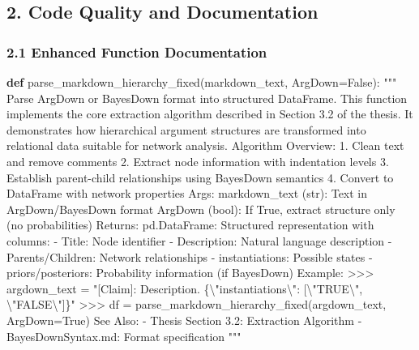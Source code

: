 \documentclass[
  11pt,
  letterpaper,
]{book}
\newenvironment{Shaded}{\begin{snugshade}}{\end{snugshade}}
\newcommand{\CharTok}[1]{\textcolor[rgb]{0.13,0.47,0.30}{#1}}
\newcommand{\CommentTok}[1]{\textcolor[rgb]{0.37,0.37,0.37}{#1}}
\newcommand{\KeywordTok}[1]{\textcolor[rgb]{0.00,0.23,0.31}{\textbf{#1}}}
\newcommand{\NormalTok}[1]{\textcolor[rgb]{0.00,0.23,0.31}{#1}}
\newcommand{\OperatorTok}[1]{\textcolor[rgb]{0.37,0.37,0.37}{#1}}
\newcommand{\VariableTok}[1]{\textcolor[rgb]{0.07,0.07,0.07}{#1}}
\begin{document}
\subsection{2. Code Quality and
Documentation}\label{code-quality-and-documentation}

\subsubsection{2.1 Enhanced Function
Documentation}\label{enhanced-function-documentation}

\begin{Shaded}
\begin{Highlighting}[]
\KeywordTok{def}\NormalTok{ parse\_markdown\_hierarchy\_fixed(markdown\_text, ArgDown}\OperatorTok{=}\VariableTok{False}\NormalTok{):}
    \CommentTok{"""}
\CommentTok{    Parse ArgDown or BayesDown format into structured DataFrame.}
\CommentTok{    }
\CommentTok{    This function implements the core extraction algorithm described in }
\CommentTok{    Section 3.2 of the thesis. It demonstrates how hierarchical argument }
\CommentTok{    structures are transformed into relational data suitable for network analysis.}
\CommentTok{    }
\CommentTok{    Algorithm Overview:}
\CommentTok{    1. Clean text and remove comments}
\CommentTok{    2. Extract node information with indentation levels}
\CommentTok{    3. Establish parent{-}child relationships using BayesDown semantics}
\CommentTok{    4. Convert to DataFrame with network properties}
\CommentTok{    }
\CommentTok{    Args:}
\CommentTok{        markdown\_text (str): Text in ArgDown/BayesDown format}
\CommentTok{        ArgDown (bool): If True, extract structure only (no probabilities)}
\CommentTok{        }
\CommentTok{    Returns:}
\CommentTok{        pd.DataFrame: Structured representation with columns:}
\CommentTok{            {-} Title: Node identifier}
\CommentTok{            {-} Description: Natural language description}
\CommentTok{            {-} Parents/Children: Network relationships}
\CommentTok{            {-} instantiations: Possible states}
\CommentTok{            {-} priors/posteriors: Probability information (if BayesDown)}
\CommentTok{            }
\CommentTok{    Example:}
\CommentTok{        \textgreater{}\textgreater{}\textgreater{} argdown\_text = "[Claim]: Description. \{}\CharTok{\textbackslash{}"}\CommentTok{instantiations}\CharTok{\textbackslash{}"}\CommentTok{: [}\CharTok{\textbackslash{}"}\CommentTok{TRUE}\CharTok{\textbackslash{}"}\CommentTok{, }\CharTok{\textbackslash{}"}\CommentTok{FALSE}\CharTok{\textbackslash{}"}\CommentTok{]\}"}
\CommentTok{        \textgreater{}\textgreater{}\textgreater{} df = parse\_markdown\_hierarchy\_fixed(argdown\_text, ArgDown=True)}
\CommentTok{        }
\CommentTok{    See Also:}
\CommentTok{        {-} Thesis Section 3.2: Extraction Algorithm}
\CommentTok{        {-} BayesDownSyntax.md: Format specification}
\CommentTok{    """}
\end{Highlighting}
\end{Shaded}
\end{document}
